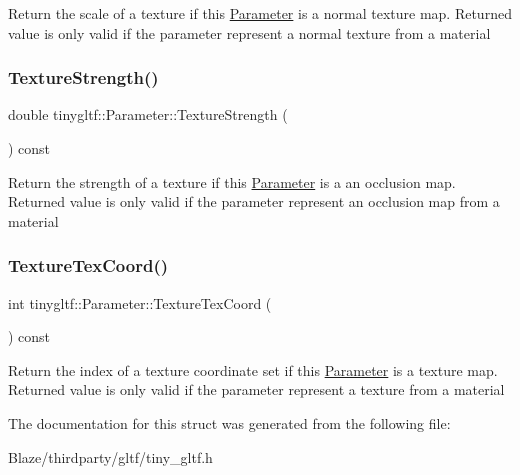 Return the scale of a texture if this \hyperlink{structtinygltf_1_1Parameter}{Parameter} is a normal texture map. Returned value is only valid if the parameter represent a normal texture from a material \mbox{\label{structtinygltf_1_1Parameter_a8c3d0b034b3a7912363f8fd13f0f2a5c}} 
\subsubsection{\texorpdfstring{Texture\+Strength()}{TextureStrength()}}
{\footnotesize\ttfamily double tinygltf\+::\+Parameter\+::\+Texture\+Strength (\begin{DoxyParamCaption}{ }\end{DoxyParamCaption}) const\hspace{0.3cm}{\ttfamily [inline]}}

Return the strength of a texture if this \hyperlink{structtinygltf_1_1Parameter}{Parameter} is a an occlusion map. Returned value is only valid if the parameter represent an occlusion map from a material \mbox{\label{structtinygltf_1_1Parameter_abc90421a12bb284886450d206d1a8a59}} 
\subsubsection{\texorpdfstring{Texture\+Tex\+Coord()}{TextureTexCoord()}}
{\footnotesize\ttfamily int tinygltf\+::\+Parameter\+::\+Texture\+Tex\+Coord (\begin{DoxyParamCaption}{ }\end{DoxyParamCaption}) const\hspace{0.3cm}{\ttfamily [inline]}}

Return the index of a texture coordinate set if this \hyperlink{structtinygltf_1_1Parameter}{Parameter} is a texture map. Returned value is only valid if the parameter represent a texture from a material 

The documentation for this struct was generated from the following file\+:\begin{DoxyCompactItemize}
\item 
Blaze/thirdparty/gltf/tiny\+\_\+gltf.\+h\end{DoxyCompactItemize}
